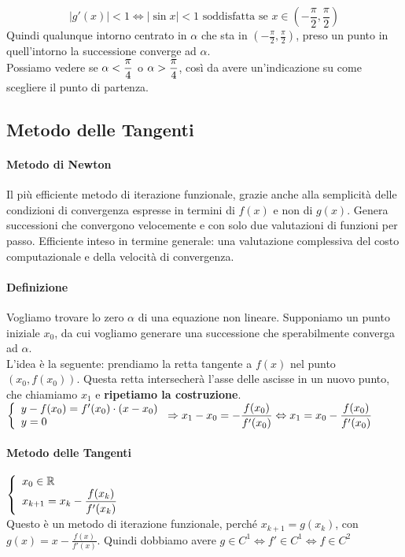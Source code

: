 \documentclass[10pt]{book}
\begin{document}
$$|g'(x)|<1\Leftrightarrow|\sin x|<1\text{ soddisfatta se }x \in \left(-\frac{\pi}{2}, \frac{\pi}{2} \right)$$
Quindi qualunque intorno centrato in $\alpha$ che sta in $\left(-\frac{\pi}{2}, \frac{\pi}{2} \right)$, preso un punto in quell'intorno la successione converge ad $\alpha$.\\
Possiamo vedere se $\alpha < \mathlarger{\frac{\pi}{4}}$ o $\alpha > \mathlarger{\frac{\pi}{4}}$, così da avere un'indicazione su come scegliere il punto di partenza.
\subsection{Metodo delle Tangenti}
\paragraph{Metodo di Newton} Il più efficiente metodo di iterazione funzionale, grazie anche alla semplicità delle condizioni di convergenza espresse in termini di $f(x)$ e non di $g(x)$. Genera successioni che convergono velocemente e con solo due valutazioni di funzioni per passo. Efficiente inteso in termine generale: una valutazione complessiva del costo computazionale e della velocità di convergenza.
\paragraph{Definizione} Vogliamo trovare lo zero $\alpha$ di una equazione non lineare. Supponiamo un punto iniziale $x_0$, da cui vogliamo generare una successione che sperabilmente converga ad $\alpha$.\\
L'idea è la seguente: prendiamo la retta tangente a $f(x)$ nel punto $(x_0, f(x_0))$. Questa retta intersecherà l'asse delle ascisse in un nuovo punto, che chiamiamo $x_1$ e \textbf{ripetiamo la costruzione}.\\
$\left\{\begin{array}{l}
y - f(x_0) = f'(x_0)\cdot(x - x_0)\\
y = 0
\end{array} \right. \Rightarrow x_1 - x_0 = -\mathlarger{\frac{f(x_0)}{f'(x_0)}} \Leftrightarrow x_1 = x_0 - \mathlarger{\frac{f(x_0)}{f'(x_0)}}$
\paragraph{Metodo delle Tangenti} $\left\{\begin{array}{l}
x_0 \in \mathbb{R}\\
x_{k+1} = x_k - \mathlarger{\frac{f(x_k)}{f'(x_k)}}
\end{array} \right.$\\
Questo è un metodo di iterazione funzionale, perché $x_{k+1} = g(x_k)$, con $g(x) = x - \frac{f(x)}{f'(x)}$. Quindi dobbiamo avere $g \in C^1 \Leftrightarrow f' \in C^1 \Leftrightarrow f \in C^2$
\end{document}
